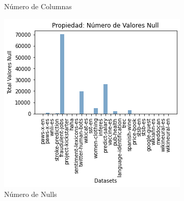 \begin{figure}
\begin{minipage}[b]{0.31\textwidth}
        \caption{Número de Columnas}
        \label{fig:columns}
  \end{minipage}      
\hspace{0.01cm}
  \begin{minipage}[b]{0.31\textwidth}
    \centering
      \includegraphics[width=\textwidth]{Graphics/results/null_values.png}
        \caption{Número de Nulls}
        \label{fig:null}
    \end{minipage} 
\end{figure}

